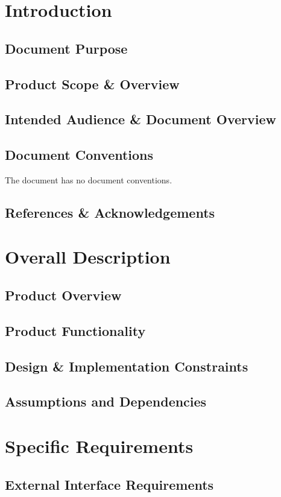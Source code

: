 \documentclass{report}
\begin{document}
	\chapter{Introduction}
		\section{Document Purpose}
		\section{Product Scope \& Overview}
		\section{Intended Audience \& Document Overview}
		\section{Document Conventions}
			The document has no document conventions.
		\section{References \& Acknowledgements}
	\chapter{Overall Description}
		\section{Product Overview}
		\section{Product Functionality}
		\section{Design \& Implementation Constraints}
		\section{Assumptions and Dependencies}
	\chapter{Specific Requirements}
		\section{External Interface Requirements}
\end{document}

